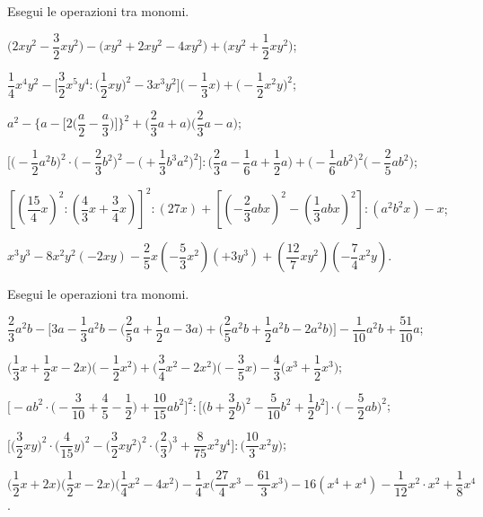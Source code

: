 \begin{esercizio}[\Ast]
 \label{ese:10.34} %
Esegui le operazioni tra monomi.

\begin{enumeratea}
 \item $\bigg(2xy^{2}-\dfrac{3}{2}xy^{2}\bigg)-\big(xy^{2}+2xy^{2}-4xy^{2}\big)+\bigg(xy^{2}+\dfrac{1}{2}xy^{2}\bigg)$;
 \item $\dfrac{1}{4}x^{4}y^{2}-\bigg[\dfrac{3}{2}x^{5}y^{4}:\bigg(\dfrac{1}{2}xy\bigg)^{2}-3x^{3}y^{2}\bigg]%
 \bigg(-{\dfrac{1}{3}}x\bigg)+\bigg(-{\dfrac{1}{2}}x^{2}y\bigg)^{2}$;
 \item $a^{2}-\Bigg\{a-\bigg[2\bigg(\dfrac{a}{2}-\dfrac{a}{3}\bigg)\bigg]\Bigg\}^{2}+%
 \bigg(\dfrac{2}{3}a+a\bigg)\bigg(\dfrac{2}{3}a-a\bigg)$;
 \item $\bigg[\bigg(-{\dfrac{1}{2}}a^{2}b\bigg)^{2}\cdot\bigg(-{\dfrac{2}{3}}b^{2}\bigg)^{2}-%
 \bigg(+{\dfrac{1}{3}}b^{3}a^{2}\bigg)^{2}\bigg]:\bigg(\dfrac{2}{3}a-\dfrac{1}{6}a+\dfrac{1}{2}a\bigg)+\bigg(-{\dfrac{1}{6}}ab^{2}\bigg)^2%
 \bigg(-{\dfrac{2}{5}}ab^2\bigg)$;
 \item $\left[\left(\dfrac{15}{4}x\right)^{2}:\left(\dfrac{4}{3}x+\dfrac{3}{4}x\right)\right]^{2}%
:(27x)+\left[\left(-{\dfrac{2}{3}}abx\right)^{2}-\left(\dfrac{1}{3}abx\right)^{2}\right]:(a^{2}b^{2}x)-x$;
 \item $x^{3}y^{3}-8x^{2}y^{2}(-2xy)-\dfrac{2}{5}x\left(-{\dfrac{5}{3}}x^{2}\right)\left(+3y^{3}\right)+\left(\dfrac{12}{7}xy^{2}\right)\left(-\dfrac{7}{4}x^{2}y\right)$.
\end{enumeratea}
\end{esercizio}


\begin{esercizio}[\Ast]
 \label{ese:10.35} %
Esegui le operazioni tra monomi.

\begin{enumeratea}
 \item $\dfrac{2}{3}a^{2}b-\bigg[3a-\dfrac{1}{3}a^{2}b-\bigg(\dfrac{2}{5}a+\dfrac{1}{2}a-3a\bigg)+\bigg(\dfrac{2}{5}a^{2}b+\dfrac{1}{2}a^{2}b-2a^{2}b\bigg)\bigg]%
 -\dfrac{1}{10}a^{2}b+\dfrac{51}{10}a$;
 \item $\bigg(\dfrac{1}{3}x+\dfrac{1}{2}x-2x\bigg)\bigg(-{\dfrac{1}{2}x^{2}}\bigg)+\bigg(\dfrac{3}{4}x^{2}-2x^{2}\bigg)\bigg(-{\dfrac{3}{5}x}\bigg)%
 -\dfrac{4}{3}\bigg(x^{3}+\dfrac{1}{2}x^{3}\bigg)$;
 \item 
 $\Bigg[-ab^{2}\cdot\bigg(-{\dfrac{3}{10}}+\dfrac{4}{5}-\dfrac{1}{2}\bigg)+\dfrac{10}{15}ab^{2}\Bigg]^{2}:\bigg[\bigg(b+\dfrac{3}{2}b\bigg)^{2}-\dfrac{5}{10}b^{2}+\dfrac{1}{2}b^{2}\bigg]\cdot\bigg(-{\dfrac{5}{2}ab}\bigg)^{2}$;
 \item $\bigg[\bigg(\dfrac{3}{2}xy\bigg)^{2}\cdot(\dfrac{4}{15}y\bigg)^{2}-\bigg(\dfrac{3}{2}xy^{2}\bigg)^{2}\cdot\bigg(\dfrac{2}{3}\bigg)^{3}%
 +\dfrac{8}{75}x^{2}y^{4}\bigg]:\bigg(\dfrac{10}{3}x^{2}y\bigg)$;
 \item $\bigg(\dfrac{1}{2}x+2x\bigg)\bigg(\dfrac{1}{2}x-2x\bigg)\bigg(\dfrac{1}{4}x^{2}-4x^{2}\bigg)-\dfrac{1}{4}x\bigg(\dfrac{27}{4}x^{3}-\dfrac{61}{3}x^{3}\bigg)%
 -16(x^{4}+x^{4})-\dfrac{1}{12}x^{2}\cdot x^{2}+\dfrac{1}{8}x^{4}$.
\end{enumeratea}
\end{esercizio}

